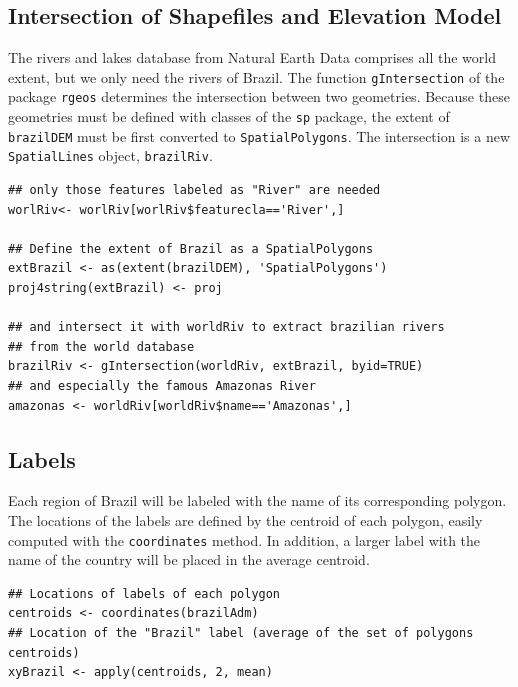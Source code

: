 \subsection{Intersection of Shapefiles and Elevation Model}
\label{sec-1-2}
The rivers and lakes database from Natural Earth Data comprises all
the world extent, but we only need the rivers of Brazil. The function
\texttt{gIntersection} of the package \texttt{rgeos} determines the intersection
between two geometries. Because these geometries must be defined with
classes of the \texttt{sp} package, the extent of \texttt{brazilDEM} must be first
converted to \texttt{SpatialPolygons}. The intersection is a new
\texttt{SpatialLines} object, \texttt{brazilRiv}.


\lstset{language=R,numbers=none}
\begin{lstlisting}
## only those features labeled as "River" are needed
worlRiv<- worlRiv[worlRiv$featurecla=='River',]

## Define the extent of Brazil as a SpatialPolygons
extBrazil <- as(extent(brazilDEM), 'SpatialPolygons')
proj4string(extBrazil) <- proj

## and intersect it with worldRiv to extract brazilian rivers
## from the world database
brazilRiv <- gIntersection(worldRiv, extBrazil, byid=TRUE)
## and especially the famous Amazonas River
amazonas <- worldRiv[worldRiv$name=='Amazonas',]
\end{lstlisting}
\subsection{Labels}
\label{sec-1-3}
Each region of Brazil will be labeled with the name of its
corresponding polygon. The locations of the labels are defined by the
centroid of each polygon, easily computed with the \texttt{coordinates}
method. In addition, a larger label with the name of the country will be
placed in the average centroid.


\lstset{language=R,numbers=none}
\begin{lstlisting}
## Locations of labels of each polygon
centroids <- coordinates(brazilAdm)
## Location of the "Brazil" label (average of the set of polygons centroids)
xyBrazil <- apply(centroids, 2, mean)
\end{lstlisting}

